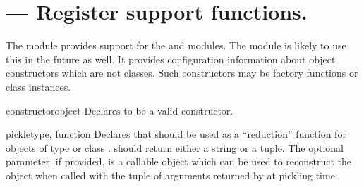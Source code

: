 \section{ ---
         Register  support functions.}



The  module provides support for the
 and
 modules.  The
 module is likely to use this in the
future as well.  It provides configuration information about object
constructors which are not classes.  Such constructors may be factory
functions or class instances.


\begin{funcdesc}{constructor}{object}
  Declares  to be a valid constructor.
\end{funcdesc}

\begin{funcdesc}{pickle}{type, function}
  Declares that  should be used as a ``reduction''
  function for objects of type or class .  
  should return either a string or a tuple.  The optional
   parameter, if provided, is a callable object which
  can be used to reconstruct the object when called with the tuple of
  arguments returned by  at pickling time.
\end{funcdesc}
